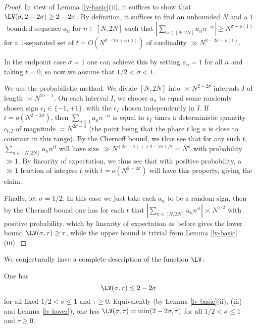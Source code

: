 \begin{proof} In view of Lemma \ref{lv-basic}(ii), it suffices to show that $\LV(\sigma, 2-2\sigma) \geq 2-2\sigma$.  By definition, it suffices to find an unbounded $N$ and a $1$-bounded sequence $a_n$ for $n \in [N,2N]$ such that $|\sum_{n \in [N,2N]} a_n n^{-it}| \geq N^{\sigma+o(1)}$ for a $1$-separated set of $t = O(N^{2-2\sigma+o(1)})$ of cardinality $\gg N^{2-2\sigma-o(1)}$.

In the endpoint case $\sigma = 1$ one can achieve this by setting $a_n=1$ for all $n$ and taking $t=0$, so now we assume that $1/2 < \sigma<1$.

We use the probabilistic method.  We divide $[N,2N]$ into $\asymp N^{2-2\sigma}$ intervals $I$ of length $\asymp N^{2\sigma-1}$.  On each interval $I$, we choose $a_n$ to equal some randomly chosen sign $\epsilon_I \in \{-1,+1\}$, with the $\epsilon_I$ chosen independently in $I$.  If $t = o(N^{2-2\sigma})$, then $\sum_{n \in I} a_n n^{-it}$ is equal to $\epsilon_I$ times a deterministic quantity $c_{t,I}$ of magnitude $\asymp N^{2\sigma-1}$ (the point being that the phase $t \log n$ is close to constant in this range).  By the Chernoff bound, we thus see that for any such $t$, $\sum_{n \in [N,2N]} a_n n^{it}$ will have size $\gg N^{(2\sigma-1) + (2-2\sigma)/2} = N^\sigma$ with probability $\gg 1$. By linearity of expectation, we thus see that with positive probability, a $\gg 1$ fraction of integers $t$ with $t = o(N^{2-2\sigma})$ will have this property, giving the claim.

Finally, let $\sigma=1/2$.  In this case we just take each $a_n$ to be a random sign, then by the Chernoff bound one has for each $t$ that $|\sum_{n \in [N,2N]} a_n n^{it}| \asymp N^{1/2}$ with positive probability, which by linearity of expectation as before gives the lower bound $\LV(\sigma,\tau) \geq \tau$, while the upper bound is trivial from Lemma \ref{lv-basic}(iii).
\end{proof}

We conjecturally have a complete description of the function $\LV$:

\begin{conjecture}\label{montgomery-conj}  One has 
    \begin{equation}\label{mont-conj}
        \LV(\sigma, \tau) \leq 2 - 2 \sigma
    \end{equation}
     for all fixed $1/2 < \sigma \leq 1$ and $\tau \geq 0$. Equivalently (by Lemma \ref{lv-basic}(ii), (iii) and Lemma \ref{lv-lower}), one has $\LV(\sigma, \tau) = \min(2 - 2 \sigma,\tau)$ for all $1/2 < \sigma \leq 1$ and $\tau \geq 0$.
\end{conjecture}

